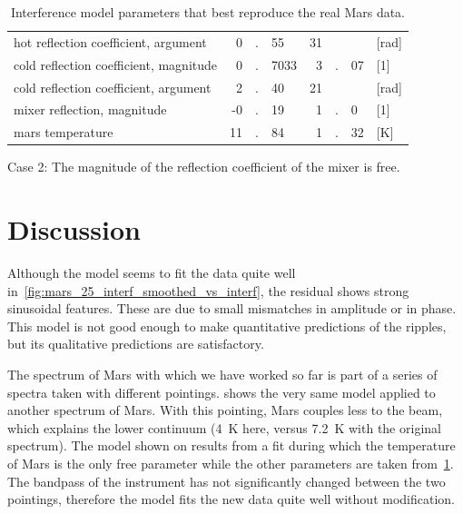 \begin{refsection}
\begin{table}
\begin{tabular}{l r@{}c@{}l r@{}c@{}l l}
            hot reflection coefficient, argument         &  0&.&55   & 31& &     & [\si{\radian}] \\
            cold reflection coefficient, magnitude       &  0&.&7033 &  3&.&07   & [1]            \\
            cold reflection coefficient, argument        &  2&.&40   & 21& &     & [\si{\radian}] \\
            mixer reflection, magnitude                  & -0&.&19   &  1&.&0    & [1]            \\
            mars temperature                             & 11&.&84   &  1&.&32   & [\si{\kelvin}] \\
        \bottomrule
    \end{tabular}
    \caption*{Case 2: The magnitude of the reflection coefficient of the mixer is free.}
    \caption{Interference model parameters that best reproduce the real Mars data.}
    \label{tab:mars_full_model}
\end{table}



\FloatBarrier



\section{Discussion}

Although the model seems to fit the data quite well in~\cref{fig:mars_25_interf_smoothed_vs_interf}, the residual shows strong sinusoidal features.
These are due to small mismatches in amplitude or in phase.
This model is not good enough to make quantitative predictions of the ripples, but its qualitative predictions are satisfactory.

The spectrum of Mars with which we have worked so far is part of a series of spectra taken with different pointings.
 shows the very same model applied to another spectrum of Mars.
With this pointing, Mars couples less to the beam, which explains the lower continuum (\SI{4}{\kelvin} here, versus \SI{7.2}{\kelvin} with the original spectrum).
The model shown on  results from a fit during which the temperature of Mars is the only free parameter while the other parameters are taken from~\cref{tab:mars_full_model}.
The bandpass of the instrument has not significantly changed between the two pointings, therefore the model fits the new data quite well without modification.


\end{refsection}
